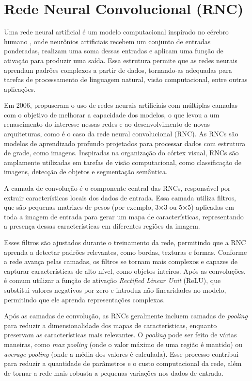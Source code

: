 \section{Rede Neural Convolucional (RNC)}\label{sec:rnc}

Uma rede neural artificial é um modelo computacional inspirado no cérebro humano \cite{McCulloch1943}, onde neurônios artificiais recebem um conjunto de entradas ponderadas, realizam uma soma dessas entradas e aplicam uma função de ativação para produzir uma saída. Essa estrutura permite que as redes neurais aprendam padrões complexos a partir de dados, tornando-as adequadas para tarefas de processamento de linguagem natural, visão computacional, entre outras aplicações.

Em 2006,  propuseram o uso de redes neurais artificiais com múltiplas camadas com o objetivo de melhorar a capacidade dos modelos, o que levou a um renascimento do interesse nessas redes e ao desenvolvimento de novas arquiteturas, como é o caso da rede neural convolucional (RNC). As RNCs são modelos de aprendizado profundo projetados para processar dados com estrutura de grade, como imagens. Inspiradas na organização do córtex visual, RNCs são amplamente utilizadas em tarefas de visão computacional, como classificação de imagens, detecção de objetos e segmentação semântica.

A camada de convolução é o componente central das RNCs, responsável por extrair características locais dos dados de entrada. Essa camada utiliza filtros, que são pequenas matrizes de pesos (por exemplo, 3×3 ou 5×5) aplicadas em toda a imagem de entrada para gerar um mapa de características, representando a presença dessas características em diferentes regiões da imagem.

Esses filtros são ajustados durante o treinamento da rede, permitindo que a RNC aprenda a detectar padrões relevantes, como bordas, texturas e formas. Conforme a rede avança pelas camadas, os filtros se tornam mais complexos e capazes de capturar características de alto nível, como objetos inteiros. Após as convoluções, é comum utilizar a função de ativação \textit{Rectified Linear Unit} (ReLU), que substitui valores negativos por zero e introduz não linearidades no modelo, permitindo que ele aprenda representações complexas.

Após as camadas de convolução, as RNCs geralmente incluem camadas de \textit{pooling} para reduzir a dimensionalidade dos mapas de características, enquanto preservam as características mais relevantes. O \textit{pooling} pode ser feito de várias maneiras, como \textit{max pooling} (onde o valor máximo de uma região é mantido) ou \textit{average pooling} (onde a média dos valores é calculada). Esse processo contribui para reduzir a quantidade de parâmetros e o custo computacional da rede, além de tornar a rede mais robusta a pequenas variações nos dados de entrada.

